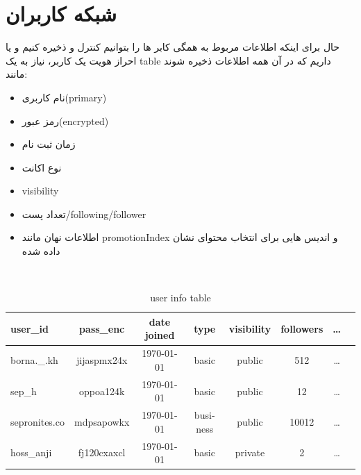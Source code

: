 \documentclass[12pt]{article}
\begin{document}
\section{شبکه کاربران}
حال برای اینکه اطلاعات مربوط به همگی کابر ها را بتوانیم کنترل و ذخیره کنیم
و یا احراز هویت یک کاربر، نیاز به یک table
داریم که در آن همه اطلاعات ذخیره شوند مانند:\\
\begin{itemize}
    \item نام کاربری(primary)
    \item رمز عبور(encrypted)
    \item زمان ثبت نام
    \item نوع اکانت
    \item visibility
    \item تعداد پست/following/follower
    \item اطلاعات نهان مانند promotionIndex و اندیس هایی برای انتخاب محتوای نشان داده شده
\end{itemize}
\
\begin{latin}
    \begin{table}[h]
        \centering
        \begin{tabular}{|l|c|c|c|c|c|c|r|}
            \hline
            user\_id      & pass\_enc   & date joined & type     & visibility
                          & followers   & \dots                               \\
            \hline
            borna.\_.kh   & jijaspmx24x & \today      & basic    & public
                          & 512         & \dots                               \\
            sep\_h        & oppoa124k   & \today      & basic    & public
                          & 12          & \dots                               \\
            sepronites.co & mdpsapowkx  & \today      & business & public
                          & 10012       & \dots                               \\
            hoss\_anji    & fj120cxaxcl & \today      & basic    & private
                          & 2           & \dots                               \\
            \hline
        \end{tabular}
        \caption{user info table}
    \end{table}
\end{latin}
\end{document}
